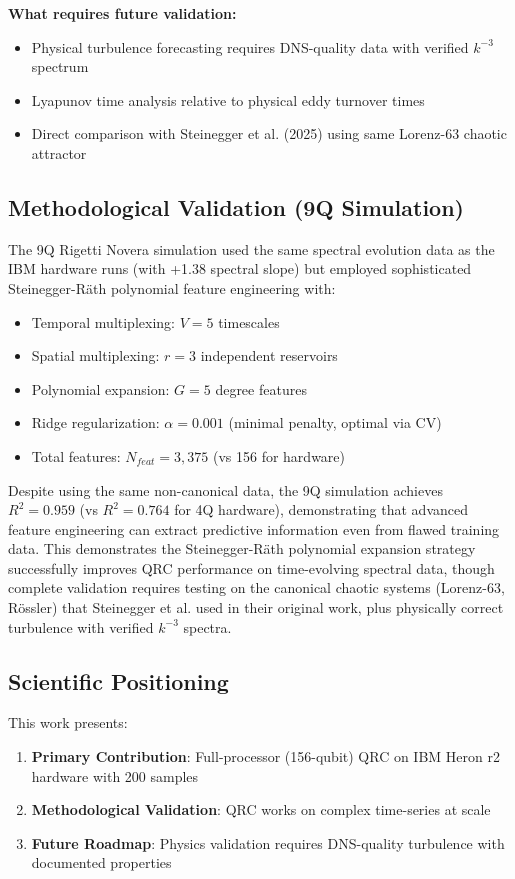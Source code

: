 \documentclass[conference]{IEEEtran}
\begin{document}
\textbf{What requires future validation:}
\begin{itemize}
    \item Physical turbulence forecasting requires DNS-quality data with verified $k^{-3}$ spectrum
    \item Lyapunov time analysis relative to physical eddy turnover times
    \item Direct comparison with Steinegger et al. (2025) using same Lorenz-63 chaotic attractor
\end{itemize}

\subsection{Methodological Validation (9Q Simulation)}

The 9Q Rigetti Novera simulation used the same spectral evolution data as the IBM hardware runs (with +1.38 spectral slope) but employed sophisticated Steinegger-Räth polynomial feature engineering with:
\begin{itemize}
    \item Temporal multiplexing: $V=5$ timescales
    \item Spatial multiplexing: $r=3$ independent reservoirs
    \item Polynomial expansion: $G=5$ degree features
    \item Ridge regularization: $\alpha=0.001$ (minimal penalty, optimal via CV)
    \item Total features: $N_{feat}=3,375$ (vs 156 for hardware)
\end{itemize}

\noindent Despite using the same non-canonical data, the 9Q simulation achieves $R^2=0.959$ (vs $R^2=0.764$ for 4Q hardware), demonstrating that advanced feature engineering can extract predictive information even from flawed training data. This demonstrates the Steinegger-Räth polynomial expansion strategy successfully improves QRC performance on time-evolving spectral data, though complete validation requires testing on the canonical chaotic systems (Lorenz-63, Rössler) that Steinegger et al. used in their original work, plus physically correct turbulence with verified $k^{-3}$ spectra.

\subsection{Scientific Positioning}

This work presents:
\begin{enumerate}
    \item \textbf{Primary Contribution}: Full-processor (156-qubit) QRC on IBM Heron r2 hardware with 200 samples
    \item \textbf{Methodological Validation}: QRC works on complex time-series at scale
    \item \textbf{Future Roadmap}: Physics validation requires DNS-quality turbulence with documented properties
\end{enumerate}
\end{document}
